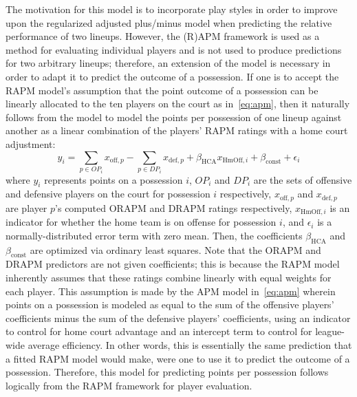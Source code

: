 The motivation for this model is to incorporate play styles in order to improve upon
the regularized adjusted plus/minus model when predicting the relative performance
of two lineups. However, the (R)APM framework is used as a method for evaluating
individual players and is not used to produce predictions for two arbitrary lineups;
therefore, an extension of the model is necessary in order to adapt it to
predict the outcome of a possession. If one is to accept the RAPM model's assumption
that the point outcome of a possession can be linearly allocated to the ten players
on the court as in~\eqref{eq:apm}, then it naturally follows from the model to model
the points per possession of one lineup against another as a linear combination of
the players' RAPM ratings with a home court adjustment:
\begin{equation} \label{eqn:baseline}
    y_i = \sum_{p \in OP_i} x_{\text{off}, p} - \sum_{p \in DP_i} x_{\text{def}, p}
    + \beta_{\text{HCA}}x_{\text{HmOff},i} + \beta_{\text{const}} + \epsilon_i
\end{equation}
where $y_i$ represents points on a possession $i$, $OP_i$ and $DP_i$ are the sets of
offensive and defensive players on the court for possession $i$ respectively,
$x_{\text{off}, p}$ and $x_{\text{def}, p}$ are player $p$'s computed ORAPM and
DRAPM ratings respectively, $x_{\text{HmOff}, i}$ is an indicator for whether the
home team is on offense for possession $i$, and $\epsilon_i$ is a
normally-distributed error term with zero mean. Then, the coefficients
$\beta_{\text{HCA}}$ and $\beta_{\text{const}}$ are optimized via ordinary least
squares. Note that the ORAPM and DRAPM predictors are not given coefficients; this
is because the RAPM model inherently assumes that these ratings combine linearly
with equal weights for each player. This assumption is made by the APM model
in~\eqref{eq:apm} wherein points on a possession is modeled as equal to the sum of
the offensive players' coefficients minus the sum of the defensive players'
coefficients, using an indicator to control for home court advantage and an
intercept term to control for league-wide average efficiency. In other words, this
is essentially the same prediction that a fitted RAPM model would make, were one to
use it to predict the outcome of a possession. Therefore, this model for predicting
points per possession follows logically from the RAPM framework for player
evaluation.

